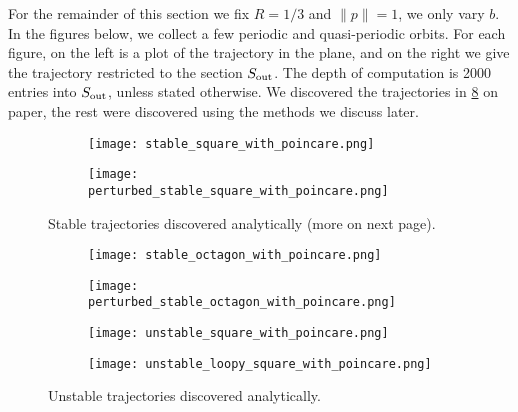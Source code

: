 
For the remainder of this section we fix $R=1/3$ and $\|p\|=1$, we only vary $b$. In the figures below, we collect a few periodic and quasi-periodic orbits. For each figure, on the left is a plot of the trajectory in the plane, and on the right we give the trajectory restricted to the section $S_\text{out}$. The depth of computation is 2000 entries into $S_\text{out}$, unless stated otherwise. We discovered the trajectories in \cref{fig:penandpaperorbits} on paper, the rest were discovered using the methods we discuss later.

\begin{figure}[!th]
\centering
\begin{subfigure}{0.49\textwidth}
\centering
\texttt{[image: stable\_square\_with\_poincare.png]}
\caption{}
\label{subfig:penandpaperorbits1}
\end{subfigure}
%
\begin{subfigure}{0.49\textwidth}
\texttt{[image: perturbed\_stable\_square\_with\_poincare.png]}
\caption{}
\label{subfig:penandpaperorbits2}
\end{subfigure}
\caption{Stable trajectories discovered analytically (more on next page).}
\end{figure}

\begin{figure}[!th]
\ContinuedFloat
\centering
\begin{subfigure}{0.49\textwidth}
\texttt{[image: stable\_octagon\_with\_poincare.png]}
\caption{}
\label{subfig:penandpaperorbits3}
\end{subfigure}
%
\begin{subfigure}{0.49\textwidth}
\texttt{[image: perturbed\_stable\_octagon\_with\_poincare.png]}
\caption{}
\label{subfig:penandpaperorbits4}
\end{subfigure}
%
\begin{subfigure}{0.49\textwidth}
\texttt{[image: unstable\_square\_with\_poincare.png]}
\caption{}
\label{subfig:penandpaperorbits5}
\end{subfigure}
%
\begin{subfigure}{0.49\textwidth}
\texttt{[image: unstable\_loopy\_square\_with\_poincare.png]}
\caption{}
\label{subfig:penandpaperorbits6}
\end{subfigure}
\caption{Unstable trajectories discovered analytically.}
\label{fig:penandpaperorbits}
\end{figure}

